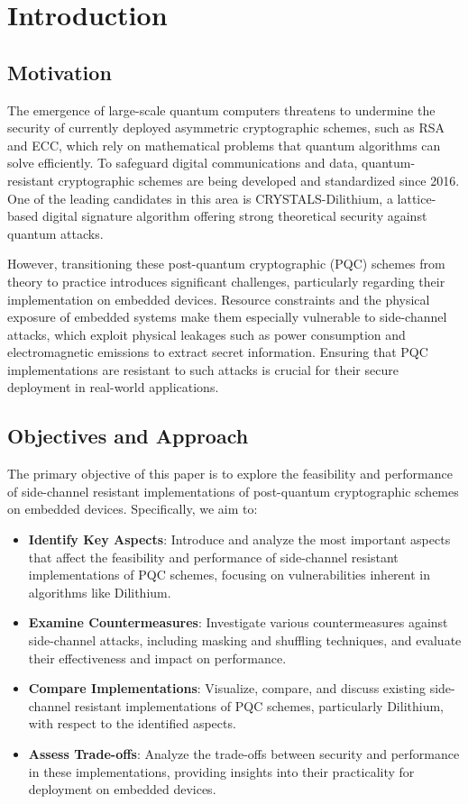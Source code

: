 \chapter{Introduction}
\thispagestyle{chapterstart}

\section{Motivation}

The emergence of large-scale quantum computers threatens to undermine the security of currently deployed asymmetric cryptographic schemes, such as RSA and \ac{ECC}, which rely on mathematical problems that quantum algorithms can solve efficiently. To safeguard digital communications and data, quantum-resistant cryptographic schemes are being developed and standardized since 2016. One of the leading candidates in this area is CRYSTALS-Dilithium, a lattice-based digital signature algorithm offering strong theoretical security against quantum attacks.

However, transitioning these post-quantum cryptographic (PQC) schemes from theory to practice introduces significant challenges, particularly regarding their implementation on embedded devices. Resource constraints and the physical exposure of embedded systems make them especially vulnerable to side-channel attacks, which exploit physical leakages such as power consumption and electromagnetic emissions to extract secret information. Ensuring that PQC implementations are resistant to such attacks is crucial for their secure deployment in real-world applications.

\section{Objectives and Approach}

The primary objective of this paper is to explore the feasibility and performance of side-channel resistant implementations of post-quantum cryptographic schemes on embedded devices. Specifically, we aim to:

\begin{itemize}
    \item \textbf{Identify Key Aspects}: Introduce and analyze the most important aspects that affect the feasibility and performance of side-channel resistant implementations of \ac{PQC} schemes, focusing on vulnerabilities inherent in algorithms like Dilithium.
    \item \textbf{Examine Countermeasures}: Investigate various countermeasures against side-channel attacks, including masking and shuffling techniques, and evaluate their effectiveness and impact on performance.
    \item \textbf{Compare Implementations}: Visualize, compare, and discuss existing side-channel resistant implementations of \ac{PQC} schemes, particularly Dilithium, with respect to the identified aspects.
    \item \textbf{Assess Trade-offs}: Analyze the trade-offs between security and performance in these implementations, providing insights into their practicality for deployment on embedded devices.
\end{itemize}

